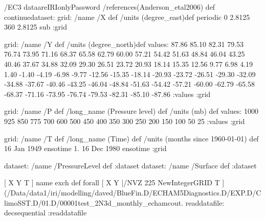 \begin{ingrid}
/EC3 dataareIRIonlyPassword
/references(Anderson_etal2006) def
continuedataset:
grid:
/name /X def
/units (degree_east)def
 periodic
 0 2.8125 360  2.8125 sub
:grid

grid:
/name /Y def
/units (degree_north)def
values:
87.86 85.10 82.31 79.53 76.74 73.95 71.16 68.37
 65.58 62.79 60.00 57.21 54.42 51.63 48.84 46.04 43.25 40.46
 37.67 34.88 32.09 29.30 26.51 23.72 20.93 18.14 15.35 12.56
 9.77  6.98  4.19  1.40   -1.40   -4.19   -6.98   -9.77  -12.56  -15.35
 -18.14  -20.93  -23.72  -26.51  -29.30  -32.09  -34.88  -37.67  -40.46  -43.25
 -46.04  -48.84  -51.63  -54.42  -57.21  -60.00  -62.79  -65.58  -68.37  -71.16
 -73.95  -76.74  -79.53  -82.31  -85.10  -87.86
:values
:grid

grid:
/name /P def
/long_name (Pressure level) def
/units (mb) def
values:
1000 925 850 775 700 600 500 450 400 350 300 250 200 150 100 50 25
:values
:grid

grid:
/name /T def
/long_name (Time) def
/units (months since 1960-01-01) def
16 Jan 1949 ensotime
1.
16 Dec 1980 ensotime
:grid

dataset: /name /PressureLevel def :dataset
dataset: /name /Surface def :dataset

[ X Y T ] { name exch def } forall
[ X Y |/NVZ 225 NewIntegerGRID T ]
(/Data/data1/iri/modelling/daved/BlueFin.D/ECHAM5Diagnostics.D/EXP.D/ClimoSST.D/01.D/00001test_2N3d_monthly_echamcout.%
readdatafile:
decsequential
:readdatafile


\end{ingrid}
